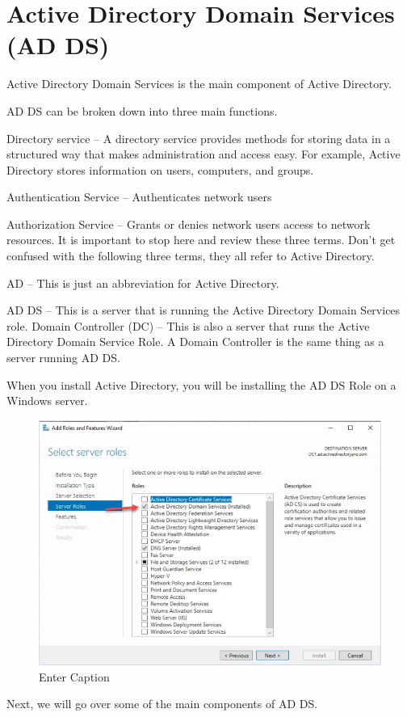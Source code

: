 \section{Active Directory Domain Services (AD DS)}
Active Directory Domain Services is the main component of Active Directory.

AD DS can be broken down into three main functions.

Directory service – A directory service provides methods for storing data in a structured way that makes administration and access easy. For example, Active Directory stores information on users, computers, and groups.

Authentication Service – Authenticates network users

Authorization Service – Grants or denies network users access to network resources.
It is important to stop here and review these three terms. Don’t get confused with the following three terms, they all refer to Active Directory.

AD – This is just an abbreviation for Active Directory.

AD DS – This is a server that is running the Active Directory Domain Services role.
Domain Controller (DC) – This is also a server that runs the Active Directory Domain Service Role. A Domain Controller is the same thing as a server running AD DS.

When you install Active Directory, you will be installing the AD DS Role on a Windows server.

\begin{figure}
    \centering
    \includegraphics[width=0.75\linewidth]{dsrole.png}
    \caption{Enter Caption}
    \label{fig:placeholder}
\end{figure}

Next, we will go over some of the main components of AD DS.

